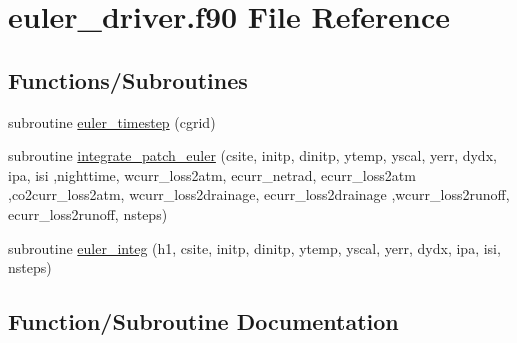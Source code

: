 \hypertarget{euler__driver_8f90}{}\section{euler\+\_\+driver.\+f90 File Reference}
\label{euler__driver_8f90}
\subsection*{Functions/\+Subroutines}
\begin{DoxyCompactItemize}
\item 
subroutine \hyperlink{euler__driver_8f90_a5219f633b6d9b0d321429096e0d3ea66}{euler\+\_\+timestep} (cgrid)
\item 
subroutine \hyperlink{euler__driver_8f90_a284012473d288e2474d9eaebf1456c2a}{integrate\+\_\+patch\+\_\+euler} (csite, initp, dinitp, ytemp, yscal, yerr, dydx, ipa, isi                                                                                                                                                               ,nighttime, wcurr\+\_\+loss2atm, ecurr\+\_\+netrad, ecurr\+\_\+loss2atm                                                                                                                                               ,co2curr\+\_\+loss2atm, wcurr\+\_\+loss2drainage, ecurr\+\_\+loss2drainage                                                                                                                               ,wcurr\+\_\+loss2runoff, ecurr\+\_\+loss2runoff, nsteps)
\item 
subroutine \hyperlink{euler__driver_8f90_a70d969f0d0abf5f83e128f4c616079e1}{euler\+\_\+integ} (h1, csite, initp, dinitp, ytemp, yscal, yerr, dydx, ipa, isi, nsteps)
\end{DoxyCompactItemize}


\subsection{Function/\+Subroutine Documentation}
\hypertarget{euler__driver_8f90_a70d969f0d0abf5f83e128f4c616079e1}{}
